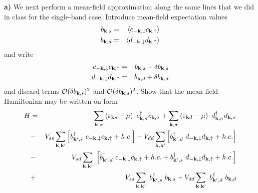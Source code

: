 \begin{problem}
\begin{center}
	\end{center}
	\ \\
	\ \\
	{\bf a)} We next perform a mean-field approximation along the same lines that we did in class for the single-band case. Introduce mean-field expectation values 
	\begin{eqnarray}
		b_{{\bf k},s} & = & \langle c_{-{\bf k},\downarrow}c_{{\bf k},\uparrow} \rangle \nonumber \\
		b_{{\bf k},d} & = & \langle d_{-{\bf k},\downarrow}d_{{\bf k},\uparrow} \rangle \nonumber 
	\end{eqnarray}
	and write 
	\begin{eqnarray}
		c_{-{\bf k},\downarrow}c_{{\bf k},\uparrow} & = & b_{{\bf k},s} + \delta b_{{\bf k},s}  \nonumber \\
		d_{-{\bf k},\downarrow}d_{{\bf k},\uparrow} & = & b_{{\bf k},d} + \delta b_{{\bf k},d}  \nonumber
	\end{eqnarray}
	and discard terms ${\cal O} (\delta b_{{\bf k},s})^2$ and ${\cal O} (\delta b_{{\bf k},s})^2$. Show that the mean-field Hamiltonian may be written on form
	\begin{eqnarray}
		H&  = &  \sum_{{\bf k},\sigma} \left( \varepsilon_{{\bf k} s} - \mu \right) ~ c^{\dagger}_{{\bf k},\sigma} c_{{\bf k},\sigma}
		+  \sum_{{\bf k},\sigma} \left( \varepsilon_{{\bf k} d} - \mu \right)  ~ d^{\dagger}_{{\bf k},\sigma} d_{{\bf k},\sigma} \nonumber \\
		& - &  V_{ss} \sum_{{\bf k},{\bf k}^{\prime}} 
		\left[ b^{\dagger}_{{\bf k}^{\prime},s} ~ c_{-{\bf k},\downarrow}c_{{\bf k},\uparrow} + h.c. \right] 
		- V_{dd} \sum_{{\bf k},{\bf k}^{\prime}} 
		\left[ b^{\dagger}_{{\bf k}^{\prime},d} ~ d_{-{\bf k},\downarrow} d_{{\bf k},\uparrow} + h.c. \right] \nonumber \\
		& - & V_{sd} \sum_{{\bf k},{\bf k}^{\prime}} ~
		\left[ b^{\dagger}_{{\bf k}^{\prime},d} ~c_{-{\bf k},\downarrow} c_{{\bf k},\uparrow} + h.c. 
		+
		b^{\dagger}_{{\bf k}^{\prime},s} ~d_{-{\bf k},\downarrow} d_{{\bf k},\uparrow}  + h.c. \right] \nonumber \\
		& + &
		V_{ss}\sum_{{\bf k},{\bf k}^{\prime}} ~b^{\dagger}_{{\bf k}^{\prime},s}~b_{{\bf k},s}
		+
		V_{dd}\sum_{{\bf k},{\bf k}^{\prime}} ~b^{\dagger}_{{\bf k}^{\prime},d}~b_{{\bf k},d}

\end{eqnarray}
\end{problem}
